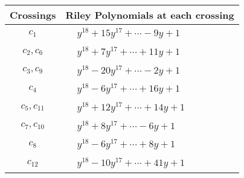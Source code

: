\documentclass[1p]{elsarticle_modified}
\theoremstyle{definition}
\begin{document}
\begin{tabular}{m{50pt}|m{274pt}}
Crossings & \hspace{64pt}Riley Polynomials at each crossing \\
\hline $$\begin{aligned}c_{1}\end{aligned}$$&$\begin{aligned}
&y^{18}+15 y^{17}+\cdots-9 y+1
\end{aligned}$\\
\hline $$\begin{aligned}c_{2},c_{6}\end{aligned}$$&$\begin{aligned}
&y^{18}+7 y^{17}+\cdots+11 y+1
\end{aligned}$\\
\hline $$\begin{aligned}c_{3},c_{9}\end{aligned}$$&$\begin{aligned}
&y^{18}-20 y^{17}+\cdots-2 y+1
\end{aligned}$\\
\hline $$\begin{aligned}c_{4}\end{aligned}$$&$\begin{aligned}
&y^{18}-6 y^{17}+\cdots+16 y+1
\end{aligned}$\\
\hline $$\begin{aligned}c_{5},c_{11}\end{aligned}$$&$\begin{aligned}
&y^{18}+12 y^{17}+\cdots+14 y+1
\end{aligned}$\\
\hline $$\begin{aligned}c_{7},c_{10}\end{aligned}$$&$\begin{aligned}
&y^{18}+8 y^{17}+\cdots-6 y+1
\end{aligned}$\\
\hline $$\begin{aligned}c_{8}\end{aligned}$$&$\begin{aligned}
&y^{18}-6 y^{17}+\cdots+8 y+1
\end{aligned}$\\
\hline $$\begin{aligned}c_{12}\end{aligned}$$&$\begin{aligned}
&y^{18}-10 y^{17}+\cdots+41 y+1
\end{aligned}$\\
\hline
\end{tabular}\\~\\
\end{document}
